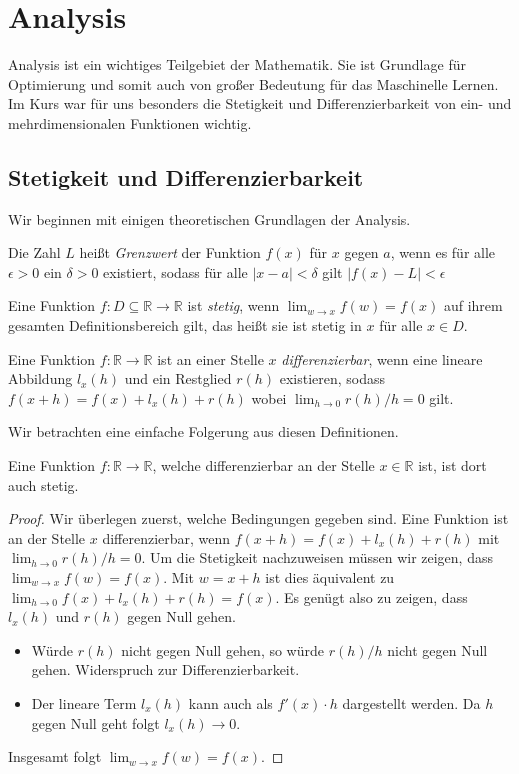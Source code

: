 

\section{Analysis}
  

Analysis ist ein wichtiges Teilgebiet der Mathematik. Sie ist Grundlage für Optimierung und somit auch von großer Bedeutung für das Maschinelle Lernen. Im Kurs war für uns besonders die Stetigkeit und Differenzierbarkeit von ein- und mehrdimensionalen Funktionen wichtig.

\subsection{Stetigkeit und Differenzierbarkeit}

Wir beginnen mit einigen theoretischen Grundlagen der Analysis.
\begin{Def} Die Zahl $L$ heißt \emph{Grenzwert} der Funktion $f(x)$ für $x$ gegen $a$, wenn es für alle $\epsilon > 0$ ein $\delta > 0$ existiert, sodass für alle $|x-a| < \delta$ gilt $|f(x)-L|<\epsilon$
\end{Def}
\begin{Def}
Eine Funktion $f: D \subseteq \mathbb{R}\rightarrow \mathbb{R}$ ist \emph{stetig}, wenn $\lim_{w\rightarrow x}f(w)=f(x)$ auf ihrem gesamten Definitionsbereich gilt, das heißt sie ist stetig in $x$ für alle $x\in D$.
\end{Def}
\begin{Def}
Eine Funktion $f:\mathbb{R}\rightarrow \mathbb{R}$ ist an einer Stelle $x$ \emph{differenzierbar}, wenn eine lineare Abbildung $ l_ x (h)$ und ein Restglied $r(h)$ existieren, sodass $f(x+h)=f(x)+l_{x}(h)+r(h)$ wobei $\lim_{h\rightarrow 0} r(h)/h= 0$ gilt.
\end{Def}
Wir betrachten eine einfache Folgerung aus diesen Definitionen.

\begin{lemma}
Eine Funktion $f:\mathbb{R} \rightarrow \mathbb{R}$, welche differenzierbar an der Stelle $x \in \mathbb{R}$ ist, ist dort auch stetig.
\end{lemma}

\begin{proof}
Wir überlegen zuerst, welche Bedingungen gegeben sind. Eine Funktion ist an der Stelle $x$ differenzierbar, wenn $f(x+h)=f(x)+l_x(h)+ r(h)$  
mit $\lim_{h \rightarrow 0} r(h)/h= 0$. Um die Stetigkeit nachzuweisen müssen wir zeigen, dass $\lim_{w \rightarrow x} f(w)=f(x)$. Mit $w = x+h$ ist dies äquivalent zu $\lim_{h \rightarrow 0} f(x)+l_x(h)+r(h)=f(x)$. Es genügt also zu zeigen, dass  $l_x(h)$ und $r(h)$ gegen Null gehen.
\begin{itemize}
  \item Würde $r(h)$ nicht gegen Null gehen, so würde $r(h)/h$ nicht gegen Null gehen. Widerspruch zur Differenzierbarkeit.
  \item Der lineare Term $l_x(h)$ kann auch als $f'(x) \cdot h$ dargestellt werden. Da $h$ gegen Null geht folgt $l_x(h)\rightarrow 0$.
\end{itemize}
Insgesamt folgt $\lim_{w\rightarrow x} f(w) = f(x)$.
\end{proof}

